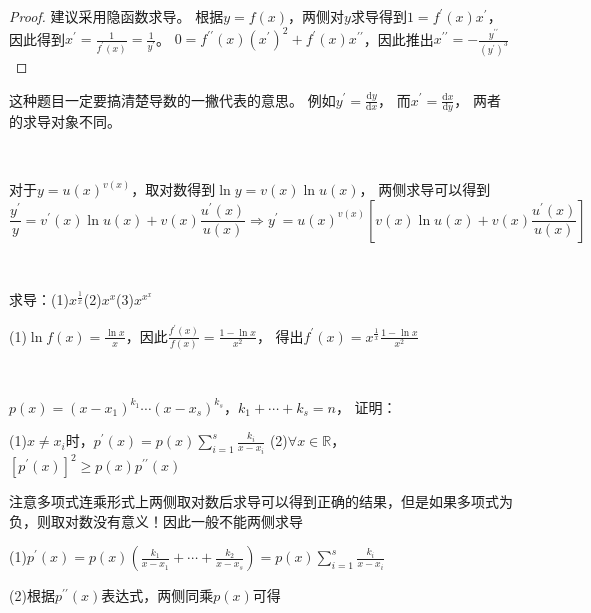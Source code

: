 \begin{proof}
  建议采用隐函数求导。
  根据$y = f(x)$，两侧对$y$求导得到$1 = f^{\prime}(x)x^{\prime}$，因此得到$x^{\prime} = \frac{1}{f^{\prime}(x)} = \frac{1}{y^{\prime}}$。
  $0 = f^{\prime\prime}(x) (x^{\prime})^2 + f^{\prime}(x) x^{\prime\prime}$，因此推出$x^{\prime\prime} = - \frac{y^{\prime\prime}}{(y^{\prime})^3}$
\end{proof}

\begin{note}
  这种题目一定要搞清楚导数的一撇代表的意思。
  例如$y^{\prime} = \frac{\mathrm{d} y}{\mathrm{d} x}$，
  而$x^{\prime} = \frac{\mathrm{d} x}{\mathrm{d} y}$，
  两者的求导对象不同。
\end{note}

~

\begin{theorem}[指数求导]
  对于$y = u(x)^{v(x)}$，取对数得到$\ln y = v(x) \ln u(x)$，
  两侧求导可以得到
  \begin{equation*}
    \frac{y^{\prime}}{y} = v^{\prime}(x)\ln u(x) + v(x) \frac{u^{\prime}(x)}{u(x)} \Rightarrow y^{\prime} = u(x)^{v(x)}[v(x) \ln u(x) + v(x) \frac{u^{\prime}(x)}{u(x)}]
  \end{equation*}
\end{theorem}

~

\begin{exercise}[指数求导练习]
  求导：(1)$x^{\frac{1}{x}}$(2)$x^x$(3)$x^{x^{x}}$
\end{exercise}

\begin{solution}
  (1)$\ln f(x) = \frac{\ln x}{x}$，因此$\frac{f^{\prime}(x)}{f(x)} = \frac{1 - \ln x}{x^2}$，
  得出$f^{\prime}(x) = x^{\frac{1}{x}} \frac{1 - \ln x}{x^2}$
\end{solution}

~

\begin{exercise}[多项式连乘求导]
  $p(x) = (x - x_1)^{k_1}\cdots (x - x_s)^{k_s}$，$k_1 + \cdots + k_s = n$，
  证明：

  (1)$x \neq x_i$时，$p^{\prime}(x) = p(x) \sum\limits_{i = 1}^s \frac{k_i}{x - x_i}$
  (2)$\forall x \in \mathbb{R}$，$[p^{\prime}(x)]^2 \geq p(x)p^{\prime\prime}(x)$
\end{exercise}

\begin{solution}
  注意多项式连乘形式上两侧取对数后求导可以得到正确的结果，但是如果多项式为负，则取对数没有意义！因此一般不能两侧求导

  (1)$p^{\prime}(x) = p(x)(\frac{k_1}{x - x_1} + \cdots + \frac{k_2}{x - x_s}) = p(x) \sum\limits_{i = 1}^s \frac{k_i}{x - x_i}$

  (2)根据$p^{\prime\prime}(x)$表达式，两侧同乘$p(x)$可得
\end{solution}


